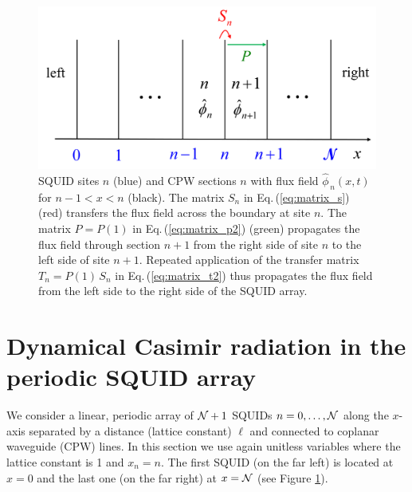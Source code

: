 \begin{figure}
    \includegraphics[width=1.0\textwidth, keepaspectratio]{figures/system/system.png}
    \caption{SQUID sites $n$ (blue) and CPW sections $n$ with flux field $\hat{\phi}_{\,n}(x,t)$ for 
    $n-1 < x < n$ (black). The matrix $S_n$ in Eq.\,(\ref{eq:matrix_s}) (red) transfers the flux field across the 
    boundary at site $n$. The matrix $P = P(1)$ in Eq.\,(\ref{eq:matrix_p2}) (green) propagates the flux field 
    through section $n+1$ from the right side of site $n$ to the left side of site $n+1$. Repeated application 
    of the transfer matrix $T_n = P(1) \, S_n$ in Eq.\,(\ref{eq:matrix_t2}) thus propagates the 
    flux field from the left side to the right side of the SQUID array.}
    \label{fig:system}
\end{figure}




\section{Dynamical Casimir radiation in the periodic SQUID array}
\label{sec:dcr}

\noindent
We consider a linear, periodic array of ${\cal N} + 1$ SQUIDs $n = 0, \ldots , {\cal N}$
along the $x$-axis separated by a distance (lattice constant) $\ell$ and connected to 
coplanar waveguide (CPW) lines. In this section we use again unitless variables 
where the lattice constant is 1 and $x_n = n$.
The first SQUID (on the far left) is located at $x=0$ and the last one 
(on the far right) at $x = {\cal N}$ (see Figure \ref{fig:system}).

